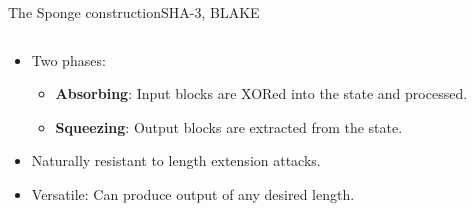 \documentclass[aspectratio=169, lualatex, handout]{beamer}
\begin{document}
\begin{frame}{The Sponge construction}{SHA-3, BLAKE}
	\begin{columns}[c]
		\begin{column}{0.55\textwidth}
			\begin{itemize}
				\item Two phases:
				      \begin{itemize}
					      \item \textbf{Absorbing}: Input blocks are XORed into the state and processed.
					      \item \textbf{Squeezing}: Output blocks are extracted from the state.
				      \end{itemize}
				\item Naturally resistant to length extension attacks.
				\item Versatile: Can produce output of any desired length.
			\end{itemize}
		\end{column}
		\begin{column}{0.45\textwidth}
		\end{column}
	\end{columns}
\end{frame}
\end{document}
